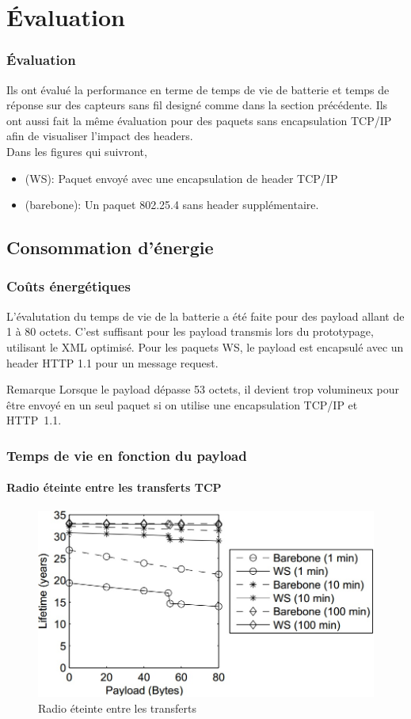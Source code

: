 \section{Évaluation}
\begin{frame}
\frametitle{Évaluation}
Ils ont évalué la performance en terme de temps de vie de batterie et temps de réponse sur des capteurs sans fil designé comme dans la section précédente.
Ils ont aussi fait la même évaluation pour des paquets sans encapsulation TCP/IP afin de visualiser l'impact des headers.\\
\vspace{5mm}
Dans les figures qui suivront,
\begin{itemize}
 \item (WS): Paquet envoyé avec une encapsulation de header TCP/IP %
 \item (barebone): Un paquet 802.25.4 sans header supplémentaire.
\end{itemize}
\end{frame}

\subsection{Consommation d'énergie}
\begin{frame}
 \frametitle{Coûts énergétiques}
 L'évalutation du temps de vie de la batterie a été faite pour des payload allant de 1 à 80 octets.
 C'est suffisant pour les payload transmis lors du prototypage, utilisant le XML optimisé.
 Pour les paquets WS, le payload est encapsulé avec un header HTTP 1.1 pour un message request.
 \begin{block}{Remarque}
  Lorsque le payload dépasse 53 octets, il devient trop volumineux pour être envoyé en un seul paquet si on utilise une encapsulation TCP/IP et HTTP~1.1.
 \end{block}
\end{frame}

\def \radiosca {0.4}
\begin{frame}
 \frametitle{Temps de vie en fonction du payload}
 \framesubtitle{Radio éteinte entre les transferts TCP}
 \begin{figure}
  \centering
  \includegraphics[scale=\radiosca]{figures/radiooff.jpg}
  \caption{Radio éteinte entre les transferts}
 \end{figure} 
\end{frame}

